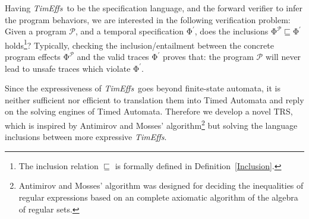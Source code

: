 \documentclass[acmsmall,10pt,review]{acmart}
\newcommand{\timedEffects}{\emph{TimEffs}}
\newcommand{\effect}{{\ensuremath{\mathrm{\Phi}}}}
\newcommand{\code}[1]{{\tt{\ensuremath{\m{#1}}}}}
\newcommand{\CONTAIN}{\sqsubseteq}
\newcommand{\m}{\mathit}
\newcommand\defref[1]{Definition~\textcolor{blue}{\ref{#1}}}
\begin{document}






Having \timedEffects\ to be  the specification language, 
and the forward verifier to infer the program behaviors, 
we are interested 
in the following verification problem: 
Given a program \code{\mathcal{P}},
and a temporal specification \code{\effect^{\prime}}, does the inclusions 
\code{\effect^{\mathcal{P}} \CONTAIN \effect^{\prime}} holds\footnote{The 
inclusion relation $\CONTAIN$ is formally defined in \defref{Inclusion}.}? Typically, 
checking the inclusion/entailment between the concrete program effects \code{\effect^{\mathcal{P}}} and the valid traces \code{\effect^{\prime}} proves that: the program \code{\mathcal{P}} will never lead to unsafe traces which violate \code{\effect^{\prime}}.

Since the expressiveness of \timedEffects\ goes beyond 
finite-state automata, it is neither sufficient nor efficient to 
 translation them 
into Timed Automata and reply on the solving engines of Timed Automata.
Therefore we 
develop a novel TRS, 
which  is inspired by Antimirov and Mosses’ algorithm\footnote{Antimirov and Mosses' 
algorithm was designed for deciding the inequalities of regular 
expressions based on an 
complete 
axiomatic algorithm of the algebra of regular sets.} \cite{DBLP:journals/tcs/AntimirovM95} but solving the 
language inclusions between more expressive \timedEffects.  

\begin{comment}
  several compositional ,  
are introduced to capture quantitative timing constraints.
The idea is to 


In this work, we study temporal verification of 
compositional real-time systems,



Existing automatic verification techniques massively rely on 
the Timed Automata which requires manually cast of clock variables with 
carefully calculated clock constraints. 

A TRS is a refutation method that normalizes expressions in such a way 
that checking their inclusion corresponds to an iterated process of 
checking the inclusion of their \emph{partial derivatives} 
\cite{antimirov1995partial}. 
Works based on such a TRS \cite{DBLP:conf/icfem/SongC20,DBLP:journals/tcs/AntimirovM95,DBLP:journals/ijfcs/AlmeidaMR09,DBLP:conf/fsttcs/KeilT14,DBLP:journals/jcss/Hovland12}  show its feasibility and suggest that this method is a better average-case algorithm than those based on the comparison of automata. 

This work targets timed temporal verification, and to the best of 
the authors' knowledge, it proposes the first algebraic TRS 
 for the real-time verification. 
\end{comment}
\end{document}
